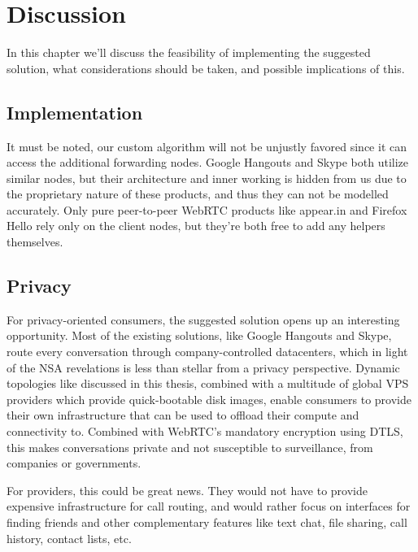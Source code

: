 \chapter{Discussion}
\label{chp:discussion}

In this chapter we'll discuss the feasibility of implementing the suggested solution, what considerations should be taken, and possible implications of this.


\section{Implementation}


It must be noted, our custom algorithm will not be unjustly favored since it can access the additional forwarding nodes. Google Hangouts and Skype both utilize similar nodes, but their architecture and inner working is hidden from us due to the proprietary nature of these products, and thus they can not be modelled accurately. Only pure peer-to-peer WebRTC products like appear.in and Firefox Hello rely only on the client nodes, but they're both free to add any helpers themselves.



\section{Privacy}

For privacy-oriented consumers, the suggested solution opens up an interesting opportunity. Most of the existing solutions, like Google Hangouts and Skype, route every conversation through company-controlled datacenters, which in light of the NSA revelations is less than stellar from a privacy perspective. Dynamic topologies like discussed in this thesis, combined with a multitude of global VPS providers which provide quick-bootable disk images, enable consumers to provide their own infrastructure that can be used to offload their compute and connectivity to. Combined with WebRTC's mandatory encryption using DTLS, this makes conversations private and not susceptible to surveillance, from companies or governments.

For providers, this could be great news. They would not have to provide expensive infrastructure for call routing, and would rather focus on interfaces for finding friends and other complementary features like text chat, file sharing, call history, contact lists, etc.

